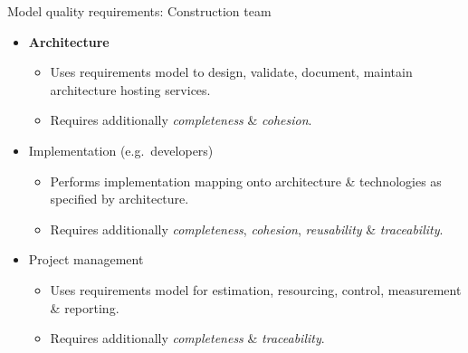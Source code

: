 \documentclass[xcolor=svgnames]{beamer}
\begin{document}

\begin{frame}{Model quality requirements: Construction team}                      
  \begin{itemize} 
    \item<+-| alert@+> {\bf Architecture} 
      \begin{itemize}
        \item Uses requirements model to design, validate, document, maintain architecture hosting services.
        \item Requires additionally {\em completeness} \& {\em cohesion}.
      \end{itemize}
    \item<+-| alert@+> Implementation (e.g.\ developers)
      \begin{itemize}
	\item Performs implementation mapping onto architecture \& technologies as specified by architecture.
	\item Requires additionally {\em completeness}, {\em cohesion}, {\em reusability} \& {\em traceability}.
      \end{itemize}
    \item<+-| alert@+> Project management
      \begin{itemize}
	\item Uses requirements model for estimation, resourcing, control, measurement \& reporting.
	\item Requires additionally {\em completeness} \& {\em traceability}.
      \end{itemize}
  \end{itemize}
\end{frame}

\end{document}
